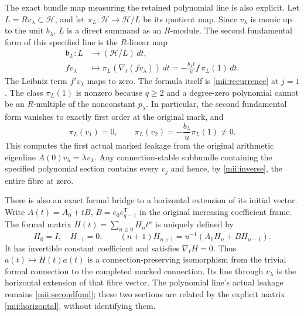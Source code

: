 \documentclass[11pt]{article}
\begin{document}
The exact bundle map measuring the retained polynomial line is
also explicit. Let $L=R v_\lambda\subset\mathscr H$, and let
$\pi_L:\mathscr H\to\mathscr H/L$ be its quotient map. Since
$v_\lambda$ is monic up to the unit $b_\lambda$, $L$ is a direct
summand as an $R$-module. The second fundamental form of this
specified line is the $R$-linear map
\begin{equation}\tag{MII23}\label{mii:secondfund}
 \begin{aligned}
 \mathfrak b_L:L&\longrightarrow(\mathscr H/L)\,dt,\\
 f v_\lambda&\longmapsto
       \pi_L(\nabla_t(fv_\lambda))\,dt
       =-\frac{b_\lambda t}{u}f\,\pi_L(1)\,dt.
 \end{aligned}
\end{equation}
The Leibniz term $f'v_\lambda$ maps to zero. The formula itself
is \eqref{mii:recurrence} at $j=1$. The class $\pi_L(1)$ is
nonzero because $q\ge2$ and a degree-zero polynomial cannot be
an $R$-multiple of the nonconstant $p_\lambda$. In particular,
the second fundamental form vanishes to exactly first order
at the original mark, and
\begin{equation}\tag{MII24}\label{mii:secondjet}
 \pi_L(v_1)=0,\qquad
 \pi_L(v_2)=-\frac{b_\lambda}{u}\pi_L(1)\ne0.
\end{equation}
This computes the first actual marked leakage from the original
arithmetic eigenline $A(0)v_\lambda=\lambda v_\lambda$.
Any connection-stable subbundle containing the specified
polynomial section contains every $v_j$ and hence, by
\eqref{mii:inverse}, the entire fibre at zero.

There is also an exact formal bridge to a horizontal extension
of its initial vector. Write
$A(t)=A_0+tB$, $B=e_0e_{q-1}^{\mathsf T}$ in the original
increasing coefficient frame. The formal matrix
$H(t)=\sum_{n\ge0}H_nt^n$ is uniquely defined by
\begin{equation}\tag{MII25}\label{mii:horizontal}
 H_0=I,\quad H_{-1}=0,\qquad
 (n+1)H_{n+1}=u^{-1}(A_0H_n+B H_{n-1}).
\end{equation}
It has invertible constant coefficient and satisfies
$\nabla_t H=0$. Thus $a(t)\mapsto H(t)a(t)$ is a
connection-preserving isomorphism from the trivial formal
connection to the completed marked connection. Its line through
$v_\lambda$ is the horizontal extension of that fibre vector.
The polynomial line's actual leakage remains
\eqref{mii:secondfund}; these two sections are related by the
explicit matrix \eqref{mii:horizontal}, without identifying them.
\end{document}
